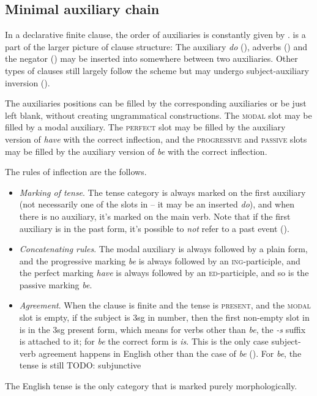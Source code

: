 \documentclass[UTF8, a4paper, oneside, scheme=plain, 12pt]{ctexbook}
\newcommand{\form}[1]{\emph{#1}}
\newcommand{\category}[1]{\textsc{#1}}
\newcommand{\formcat}[1]{\textsc{#1}}
\begin{document}
\subsection{Minimal auxiliary chain}\label{sec:auxiliary-chain}

In a declarative finite clause,  
the order of auxiliaries is constantly given by .
 is a part of the larger picture of clause structure:
The auxiliary \form{do} (), 
adverbs ()
and the negator ()
may be inserted into somewhere between two auxiliaries.
Other types of clauses still largely follow the scheme but 
may undergo subject-auxiliary inversion ().

The auxiliaries positions can be filled by the corresponding auxiliaries or be just left blank,
without creating ungrammatical constructions.
The \category{modal} slot may be filled by a modal auxiliary.
The \category{perfect} slot may be filled by the auxiliary version of \form{have} with the correct inflection,
and the \category{progressive} and \category{passive} slots 
may be filled by the auxiliary version of \form{be} with the correct inflection.

The rules of inflection are the follows.
\begin{itemize}
    \item \emph{Marking of tense}. The tense category is always marked on the first auxiliary
    (not necessarily one of the slots in 
    -- it may be an inserted \form{do}),
    and when there is no auxiliary,
    it's marked on the main verb.
    Note that if the first auxiliary is in the past form,
    it's possible to \emph{not} refer to a past event ().
    \item \emph{Concatenating rules}. The modal auxiliary is always followed by a plain form,
    and the progressive marking \form{be} is always followed by an \formcat{ing}-participle,
    and the perfect marking \form{have} is always followed by an \formcat{ed}-participle,
    and so is the passive marking \form{be}.
    \item \emph{Agreement}. When the clause is finite and the tense is \category{present},
    and the \category{modal} slot is empty,
    if the subject is 3sg in number,
    then the first non-empty slot in 
    is in the 3sg present form,
    which means for verbs other than \form{be}, the \form{-s} suffix is attached to it;
    for \form{be} the correct form is \form{is}.
    This is the only case subject-verb agreement happens in English 
    other than the case of \form{be} ().
    For \form{be}, the tense is still  TODO: subjunctive 
\end{itemize}
The English tense is the only category that is marked purely morphologically.
\end{document}
